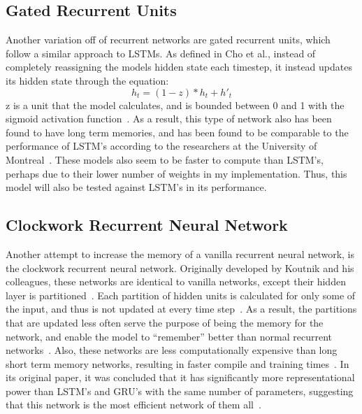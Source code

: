 \documentclass[12pt]{article}
\begin{document}
\subsection{Gated Recurrent Units}
Another variation off of recurrent networks are gated recurrent units, which
follow a similar approach to LSTMs. As defined in Cho et al., instead of
completely reassigning the models hidden state each timestep, it instead updates
its hidden state through the equation:
$$h_t = (1 - z) * h_t + h'_t $$
z is a unit that the model calculates, and is bounded between 0 and 1 with the
sigmoid activation function~\cite{gru}. As a result, this type of network also
has been found to have long term memories, and has been found to be comparable
to the performance of LSTM's according to the researchers at the University of
Montreal~\cite{gru}. These models also seem to be faster to compute than LSTM's,
perhaps due to their lower number of weights in my implementation. Thus, this
model will also be tested against LSTM's in its performance.


\subsection{Clockwork Recurrent Neural Network}
Another attempt to increase the memory of a vanilla recurrent neural network, is
the clockwork recurrent neural network. Originally developed by Koutnik and his
colleagues, these networks are identical to vanilla networks, except their
hidden layer is partitioned~\cite{cw-rnn}. Each partition of hidden units is
calculated for only some of the input, and thus is not updated at every time
step~\cite{cw-rnn}. As a result, the partitions that are updated less often
serve the purpose of being the memory for the network, and enable the model to
``remember'' better than normal recurrent networks~\cite{cw-rnn}. Also, these
networks are less computationally expensive than long short term memory
networks, resulting in faster compile and training times~\cite{cw-rnn}. In its
original paper, it was concluded that it has significantly more representational
power than LSTM's and GRU's with the same number of parameters, suggesting that
this network is the most efficient network of them all~\cite{cw-rnn}.
\end{document}
